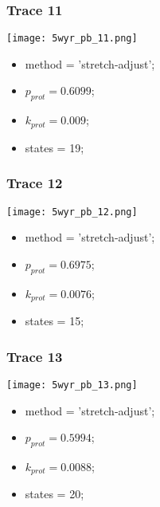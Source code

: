 \subsubsection{Trace 11}
\begin{minipage}[c]{0.7\textwidth}
    \texttt{[image: 5wyr\_pb\_11.png]}
\end{minipage}
\hfill
\begin{minipage}[c]{0.45\textwidth}
    \begin{itemize}
        \item method = 'stretch-adjust';
        \item $p_{prot}=0.6099$;
        \item $k_{prot}=0.009$;
        \item states = 19;
    \end{itemize}
\end{minipage}

\subsubsection{Trace 12}
\begin{minipage}[c]{0.7\textwidth}
    \texttt{[image: 5wyr\_pb\_12.png]}
\end{minipage}
\hfill
\begin{minipage}[c]{0.45\textwidth}
    \begin{itemize}
        \item method = 'stretch-adjust';
        \item $p_{prot}=0.6975$;
        \item $k_{prot}=0.0076$;
        \item states = 15;
    \end{itemize}
\end{minipage}

\subsubsection{Trace 13}
\begin{minipage}[c]{0.7\textwidth}
    \texttt{[image: 5wyr\_pb\_13.png]}
\end{minipage}
\hfill
\begin{minipage}[c]{0.45\textwidth}
    \begin{itemize}
        \item method = 'stretch-adjust';
        \item $p_{prot}=0.5994$;
        \item $k_{prot}=0.0088$;
        \item states = 20;
    \end{itemize}
\end{minipage}

